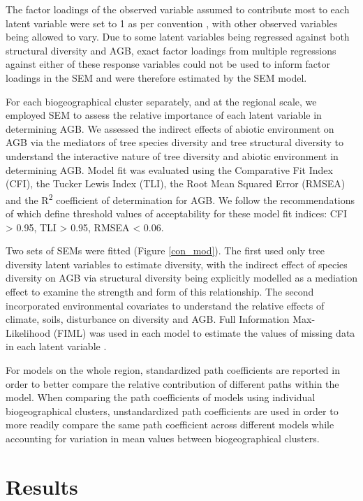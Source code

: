 \documentclass[11pt,a4paper]{article}
\begin{document}
The factor loadings of the observed variable assumed to contribute most to each latent variable were set to 1 as per convention \citep{}, with other observed variables being allowed to vary. Due to some latent variables being regressed against both structural diversity and AGB, exact factor loadings from multiple regressions against either of these response variables could not be used to inform factor loadings in the SEM and were therefore estimated by the SEM model.

For each biogeographical cluster separately, and at the regional scale, we employed SEM to assess the relative importance of each latent variable in determining AGB. We assessed the indirect effects of abiotic environment on AGB via the mediators of tree species diversity and tree structural diversity to understand the interactive nature of tree diversity and abiotic environment in determining AGB. Model fit  was evaluated using the Comparative Fit Index (CFI), the Tucker Lewis Index (TLI), the Root Mean Squared Error (RMSEA) and the R\textsuperscript{2} coefficient of determination for AGB. We follow the recommendations of \citet{Hu1999} which define threshold values of acceptability for these model fit indices: CFI \textgreater{} 0.95, TLI \textgreater{} 0.95, RMSEA \textless{} 0.06.


Two sets of SEMs were fitted (Figure \ref{con_mod}). The first used only tree diversity latent variables to estimate diversity, with the indirect effect of species diversity on AGB via structural diversity being explicitly modelled as a mediation effect to examine the strength and form of this relationship. The second incorporated environmental covariates to understand the relative effects of climate, soils, disturbance on diversity and AGB. Full Information Max-Likelihood (FIML) was used in each model to estimate the values of missing data in each latent variable \citep{Kline2005}.

For models on the whole region, standardized path coefficients are reported in order to better compare the relative contribution of different paths within the model. When comparing the path coefficients of models using individual biogeographical clusters, unstandardized path coefficients are used in order to more readily compare the same path coefficient across different models while accounting for variation in mean values between biogeographical clusters.

\section{Results}
\end{document}
